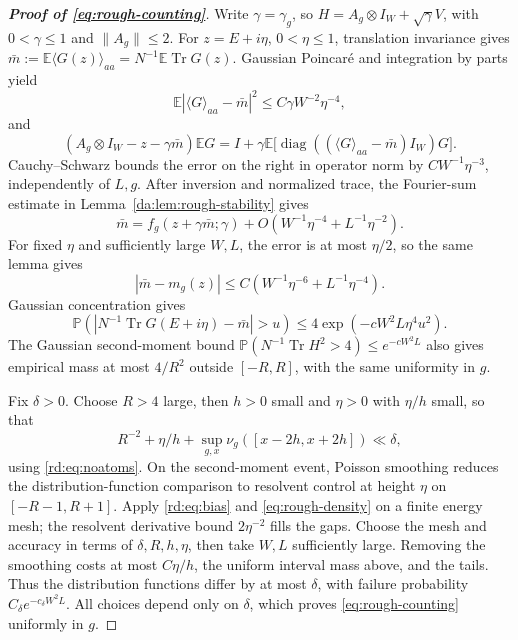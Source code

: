 \documentclass[11pt]{article}
\numberwithin{equation}{section}
\theoremstyle{remark}
\newcommand{\E}{\mathbb E}
\newcommand{\Prob}{\mathbb P}
\newcommand{\Tr}{\operatorname{Tr}}
\newcommand{\diag}{\operatorname{diag}}
\begin{document}
\begin{proof}[\textbf{Proof of \eqref{eq:rough-counting}}]
Write $\gamma=\gamma_g$, so $H=A_g\otimes I_W+\sqrt\gamma V$,
with $0<\gamma\le1$ and $\|A_g\|\le2$. For $z=E+i\eta$,
$0<\eta\le1$, translation invariance gives
$\bar m:=\E\langle G(z)\rangle_{aa}=N^{-1}\E\Tr G(z)$.
Gaussian Poincar\'e and integration by parts yield
\begin{equation}\label{rd:eq:poincare}
 \E|\langle G\rangle_{aa}-\bar m|^2\le C\gamma W^{-2}\eta^{-4},
\end{equation}
and
\begin{equation}\label{rd:eq:mean}
 (A_g\otimes I_W-z-\gamma\bar m)\E G
 =I+\gamma\E\bigl[\diag((\langle G\rangle_{aa}-\bar m)I_W)G\bigr].
\end{equation}
Cauchy--Schwarz bounds the error on the right in operator norm by
$CW^{-1}\eta^{-3}$, independently of $L,g$.
After inversion and normalized trace, the Fourier-sum estimate in
Lemma~\ref{da:lem:rough-stability} gives
\begin{equation}\label{rd:eq:approximate}
 \bar m=f_g(z+\gamma\bar m;\gamma)
       +O\left(W^{-1}\eta^{-4}+L^{-1}\eta^{-2}\right).
\end{equation}
For fixed $\eta$ and sufficiently large $W,L$, the error is at most
$\eta/2$, so the same lemma gives
\begin{equation}\label{rd:eq:bias}
 |\bar m-m_g(z)|\le C\left(W^{-1}\eta^{-6}+L^{-1}\eta^{-4}\right).
\end{equation}
Gaussian concentration gives
\begin{equation}\label{eq:rough-density}
 \Prob\left(\left|N^{-1}\Tr G(E+i\eta)-\bar m\right|>u\right)
 \le4\exp(-cW^2L\eta^4u^2).
\end{equation}
The Gaussian second-moment bound
$\Prob(N^{-1}\Tr H^2>4)\le e^{-cW^2L}$ also gives empirical mass
at most $4/R^2$ outside $[-R,R]$, with the same uniformity in $g$.

Fix $\delta>0$. Choose $R>4$ large, then $h>0$ small and $\eta>0$
with $\eta/h$ small, so that
\[
 R^{-2}+\eta/h+\sup_{g,x}\nu_g([x-2h,x+2h])\ll\delta,
\]
using \eqref{rd:eq:noatoms}. On the second-moment event, Poisson
smoothing reduces the distribution-function comparison to resolvent
control at height $\eta$ on $[-R-1,R+1]$. Apply \eqref{rd:eq:bias}
and \eqref{eq:rough-density} on a finite energy mesh; the resolvent
derivative bound $2\eta^{-2}$ fills the gaps. Choose the mesh and
accuracy in terms of $\delta,R,h,\eta$, then take $W,L$ sufficiently
large. Removing the smoothing costs at most $C\eta/h$, the uniform
interval mass above, and the tails. Thus the distribution functions
differ by at most $\delta$, with failure probability
$C_\delta e^{-c_\delta W^2L}$. All choices depend only on $\delta$,
which proves \eqref{eq:rough-counting} uniformly in $g$.
\end{proof}
\end{document}
